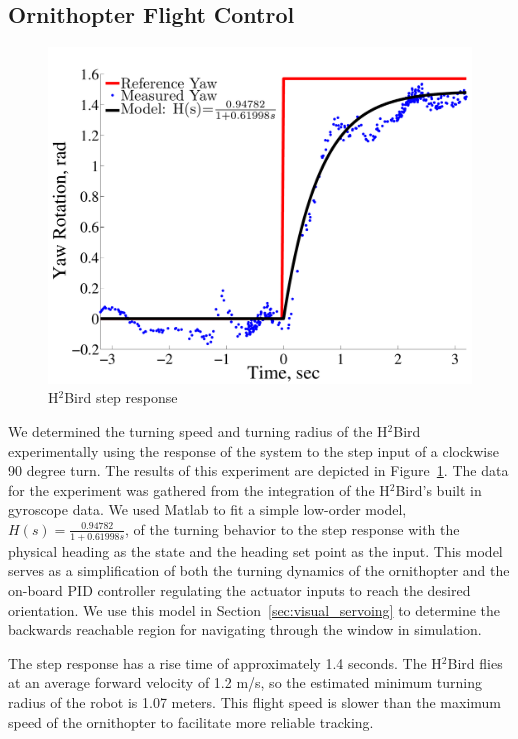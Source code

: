 \documentclass{aamas2013}
\begin{document}
\subsection{Ornithopter Flight Control}
\label{sec:flight_control}
\begin{figure}[tb]
\centering
\includegraphics[width=\linewidth]{figures/step_response_total.pdf}
\caption{H$^2$Bird step response}
\label{fig:step_response}
\end{figure}

We determined the turning speed and turning radius of the H$^2$Bird
experimentally using the response of the system to the step input of a
clockwise 90 degree turn. The results of this experiment are depicted in
Figure~\ref{fig:step_response}. The data for the experiment was gathered from
the integration of the H$^2$Bird's built in gyroscope data. We used Matlab to
fit a simple low-order model, $H(s) = \frac{0.94782}{1+0.61998s}$, of the
turning behavior to the step response with the physical heading as the state
and the heading set point as the input. This model serves as a simplification
of both the turning dynamics of the ornithopter and the on-board PID
controller regulating the actuator inputs to reach the desired orientation. We
use this model in Section~\ref{sec:visual_servoing} to determine the backwards
reachable region for navigating through the window in simulation.

The step response has a rise time of approximately 1.4 seconds. The H$^2$Bird
flies at an average forward velocity of 1.2 m/s, so the estimated minimum
turning radius of the robot is 1.07 meters. This flight speed is slower than
the maximum speed of the ornithopter to facilitate more reliable tracking.
\end{document}
